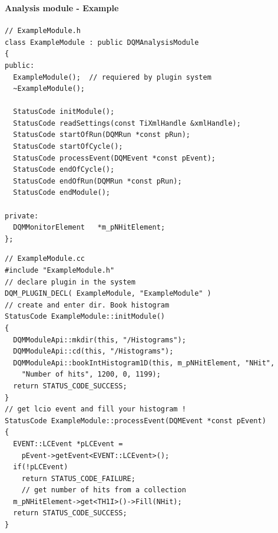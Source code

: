 \documentclass[8pt]{beamer}
\begin{document}
  
    \begin{frame}[containsverbatim]
      \frametitle{\secname}
      \framesubtitle{Analysis module - Example }

      \begin{minipage}{0.49\textwidth}
        \begin{lstlisting}
// ExampleModule.h
class ExampleModule : public DQMAnalysisModule
{
public:
  ExampleModule();  // requiered by plugin system
  ~ExampleModule();
  
  StatusCode initModule();
  StatusCode readSettings(const TiXmlHandle &xmlHandle);
  StatusCode startOfRun(DQMRun *const pRun);
  StatusCode startOfCycle();
  StatusCode processEvent(DQMEvent *const pEvent);
  StatusCode endOfCycle();
  StatusCode endOfRun(DQMRun *const pRun);
  StatusCode endModule();

private:
  DQMMonitorElement   *m_pNHitElement;
};
        \end{lstlisting}         
      \end{minipage}
      \begin{minipage}{0.49\textwidth}
        \begin{lstlisting}
// ExampleModule.cc
#include "ExampleModule.h"
// declare plugin in the system
DQM_PLUGIN_DECL( ExampleModule, "ExampleModule" )
// create and enter dir. Book histogram
StatusCode ExampleModule::initModule()
{
  DQMModuleApi::mkdir(this, "/Histograms");
  DQMModuleApi::cd(this, "/Histograms");
  DQMModuleApi::bookIntHistogram1D(this, m_pNHitElement, "NHit",
    "Number of hits", 1200, 0, 1199);
  return STATUS_CODE_SUCCESS;
}
// get lcio event and fill your histogram !
StatusCode ExampleModule::processEvent(DQMEvent *const pEvent)
{
  EVENT::LCEvent *pLCEvent = 
    pEvent->getEvent<EVENT::LCEvent>();
  if(!pLCEvent)
    return STATUS_CODE_FAILURE;
    // get number of hits from a collection
  m_pNHitElement->get<TH1I>()->Fill(NHit);
  return STATUS_CODE_SUCCESS;
}
        \end{lstlisting}  
      \end{minipage}


    \end{frame}
  
  
  
  
  
  
  
  
  
  
  
\end{document}
